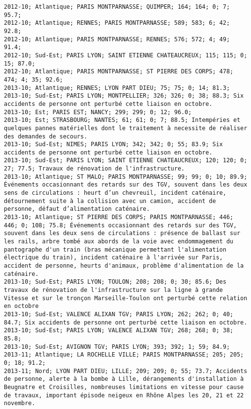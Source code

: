\documentclass{article}
\begin{document}
\begin{Verbatim}[commandchars=\\\{\}]
2012-10; Atlantique; PARIS MONTPARNASSE; QUIMPER; 164; 164; 0; 7; 95.7; 
2012-10; Atlantique; RENNES; PARIS MONTPARNASSE; 589; 583; 6; 42; 92.8; 
2012-10; Atlantique; PARIS MONTPARNASSE; RENNES; 576; 572; 4; 49; 91.4; 
2012-10; Sud-Est; PARIS LYON; SAINT ETIENNE CHATEAUCREUX; 115; 115; 0; 15; 87.0; 
2012-10; Atlantique; PARIS MONTPARNASSE; ST PIERRE DES CORPS; 478; 474; 4; 35; 92.6; 
2013-10; Atlantique; RENNES; LYON PART DIEU; 75; 75; 0; 14; 81.3; 
2013-10; Sud-Est; PARIS LYON; MONTPELLIER; 326; 326; 0; 38; 88.3; Six accidents de personne ont perturbé cette liaison en octobre.
2013-10; Est; PARIS EST; NANCY; 299; 299; 0; 12; 96.0; 
2013-10; Est; STRASBOURG; NANTES; 61; 61; 0; 7; 88.5; Intempéries et quelques pannes matérielles dont le traitement à necessite de réaliser des demandes de secours.
2013-10; Sud-Est; NIMES; PARIS LYON; 342; 342; 0; 55; 83.9; Six accidents de personne ont perturbé cette liaison en octobre.
2013-10; Sud-Est; PARIS LYON; SAINT ETIENNE CHATEAUCREUX; 120; 120; 0; 27; 77.5; Travaux de rénovation de l'infrastructure.
2013-10; Atlantique; ST MALO; PARIS MONTPARNASSE; 99; 99; 0; 10; 89.9; Événements occasionnant des retards sur des TGV, souvent dans les deux sens de circulations : heurt d’un chevreuil, incident caténaire, détournement suite à la collision avec un camion, accident de personne, défaut d’alimentation caténaire.
2013-10; Atlantique; ST PIERRE DES CORPS; PARIS MONTPARNASSE; 446; 446; 0; 108; 75.8; Événements occasionnant des retards sur des TGV, souvent dans les deux sens de circulations : présence de ballast sur les rails, arbre tombé aux abords de la voie avec endommagement du pantographe d'un train (bras mécanique permettant l'alimentation électrique du train), incident caténaire à l'arrivée sur Paris, accident de personne, heurts d'animaux, problème d'alimentation de la caténaire.
2013-10; Sud-Est; PARIS LYON; TOULON; 208; 208; 0; 30; 85.6; Des travaux de rénovation de l'infrastructure sur la ligne à grande Vitesse et sur le tronçon Marseille-Toulon ont perturbé cette relation en octobre
2013-10; Sud-Est; VALENCE ALIXAN TGV; PARIS LYON; 262; 262; 0; 40; 84.7; Six accidents de personne ont perturbé cette liaison en octobre.
2013-10; Sud-Est; PARIS LYON; VALENCE ALIXAN TGV; 268; 268; 0; 38; 85.8; 
2013-10; Sud-Est; AVIGNON TGV; PARIS LYON; 393; 392; 1; 59; 84.9; 
2013-11; Atlantique; LA ROCHELLE VILLE; PARIS MONTPARNASSE; 205; 205; 0; 18; 91.2; 
2013-11; Nord; LYON PART DIEU; LILLE; 209; 209; 0; 55; 73.7; Accidents de personne, alerte à la bombe à Lille, dérangements d'installation à Beugnatre et Croisilles, nombreuses limitations en vitesse pour cause de travaux, important épisode neigeux en Rhône Alpes les 20, 21 et 22 novembre.

\end{Verbatim}
\end{document}
